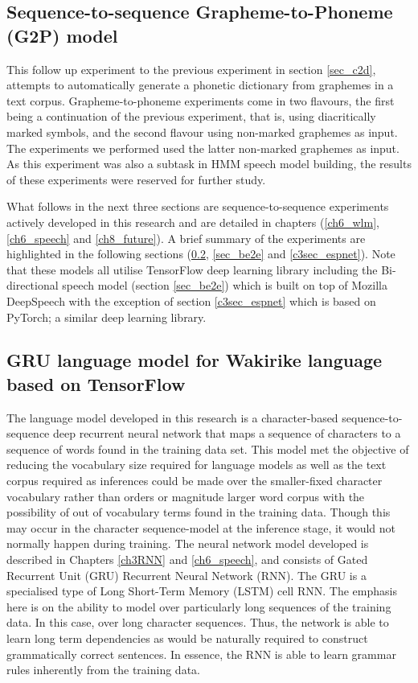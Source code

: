 \subsection{Sequence-to-sequence Grapheme-to-Phoneme (G2P) model}\label{sec_c3_g2p}
This follow up experiment to the previous experiment in section \ref{sec_c2d},  attempts to automatically generate a phonetic dictionary from graphemes in a text corpus. Grapheme-to-phoneme experiments come in two flavours, the first being a continuation of the previous experiment, that is, using diacritically marked symbols, and the second flavour using non-marked graphemes as input.  The experiments we performed used the latter non-marked graphemes as input. As this experiment was also a subtask in HMM speech model building,  the results of these experiments were reserved for further study.

What follows in the next three sections are sequence-to-sequence experiments actively developed in this research and are detailed in chapters (\ref{ch6_wlm},\ref{ch6_speech} and \ref{ch8_future}).  A brief summary of the experiments are highlighted in the following sections (\ref{sec_grulm}, \ref{sec_be2e} and \ref{c3sec_espnet}).  Note that these models all utilise TensorFlow deep learning library including the Bi-directional speech model (section \ref{sec_be2e}) which is built on top of Mozilla DeepSpeech with the exception of section \ref{c3sec_espnet} which is based on PyTorch; a similar deep learning library.

\subsection{GRU language model for Wakirike language based on TensorFlow}\label{sec_grulm}
The language model developed in this research is a character-based sequence-to-sequence deep recurrent neural network that maps a sequence of characters to a sequence of words found in the training data set. This model met the objective of reducing the vocabulary size required for language models as well as the text corpus required as inferences could be made over the smaller-fixed character vocabulary rather than orders or magnitude larger word corpus with the possibility of out of vocabulary terms found in the training data.  Though this may occur in the character sequence-model at the inference stage, it would not normally happen during training.  The neural network model developed is described in Chapters \ref{ch3RNN} and \ref{ch6_speech}, and consists of Gated Recurrent Unit (GRU) Recurrent Neural Network (RNN). The GRU is a specialised type of Long Short-Term Memory (LSTM) cell RNN.  The emphasis here is on the ability to model over particularly long sequences of the training data.  In this case, over long character sequences.  Thus, the network is able to learn long term dependencies as would be naturally required to construct grammatically correct sentences.  In essence, the RNN is able to learn grammar rules inherently from the training data.

